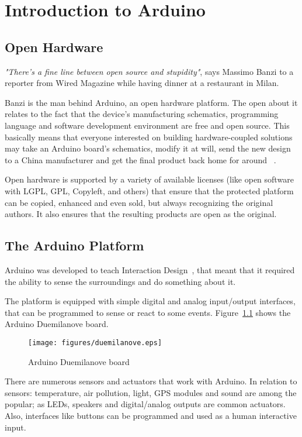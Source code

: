 \chapter{Introduction to Arduino}\label{introToArduino}

\section{Open Hardware}
\emph{"There's a fine line between open source and stupidity"}, says Massimo Banzi to a reporter from Wired Magazine while having dinner at a restaurant in Milan. 

Banzi is the man behind Arduino, an open hardware platform. The open about it relates to the fact that the device's manufacturing schematics, programming language and software development environment are free and open source. This basically means that everyone interested on building hardware-coupled solutions may take an Arduino board's schematics, modify it at will, send the new design to a China manufacturer and get the final product back home for around ~\cite{wiredOpenHardware}.

Open hardware is supported by a variety of available licenses (like open software with LGPL, GPL, Copyleft, and others) that ensure that the protected platform can be copied, enhanced and even sold, but always recognizing the original authors. It also ensures that the resulting products are open as the original.

\section{The Arduino Platform}
Arduino was developed to teach Interaction Design~\cite{banzi2008getting}, that meant that it required the ability to sense the surroundings and do something about it.

The platform is equipped with simple digital and analog input/output interfaces, that can be programmed to sense or react to some events. Figure~\ref{fig:ArduinoBoard} shows the Arduino Duemilanove board.

\begin{figure}[htbp]
  \centering
  \texttt{[image: figures/duemilanove.eps]}
  \caption{Arduino Duemilanove board
  \label{fig:ArduinoBoard}}
\end{figure}

There are numerous sensors and actuators that work with Arduino. In relation to sensors: temperature, air pollution, light, GPS modules and sound are among the popular; as LEDs, speakers and digital/analog outputs are common actuators. Also, interfaces like buttons can be programmed and used as a human interactive input.

